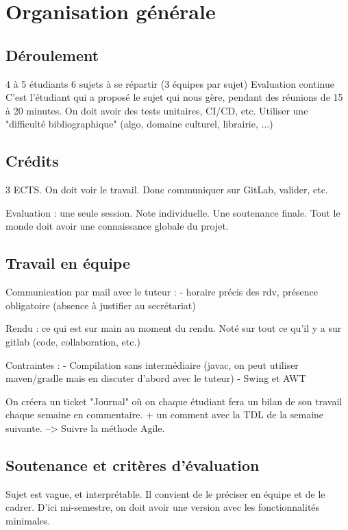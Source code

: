 \documentclass{article}
\begin{document}

\section{Organisation générale}
\subsection{Déroulement}
4 à 5 étudiants
6 sujets à se répartir (3 équipes par sujet)
Evaluation continue
C'est l'étudiant qui a proposé le sujet qui nous gère, pendant des réunions de 15 à 20 minutes.
On doit avoir des tests unitaires, CI/CD, etc.
Utiliser une "difficulté bibliographique" (algo, domaine culturel, librairie, ...)

\subsection{Crédits}
3 ECTS.
On doit voir le travail. Donc communiquer sur GitLab, valider, etc.

Evaluation : une seule session.
Note individuelle. Une soutenance finale.
Tout le monde doit avoir une connaissance globale du projet.

\subsection{Travail en équipe}
Communication par mail avec le tuteur :
- horaire précis des rdv, présence obligatoire (absence à justifier au secrétariat)

Rendu : ce qui est sur main au moment du rendu. 
Noté sur tout ce qu'il y a sur gitlab (code, collaboration, etc.)

Contraintes :
- Compilation sans intermédiaire (javac, on peut utiliser maven/gradle mais en discuter d'abord avec le tuteur)
- Swing et AWT 

On créera un ticket "Journal" où on chaque étudiant fera un bilan de son travail chaque semaine en commentaire.
+ un comment avec la TDL de la semaine suivante.
--> Suivre la méthode Agile.

\subsection{Soutenance et critères d'évaluation}

Sujet est vague, et interprétable. Il convient de le préciser en équipe et de le cadrer.
D'ici mi-semestre, on doit avoir une version avec les fonctionnalités minimales.
\end{document}
